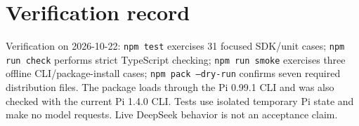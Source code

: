\documentclass[10pt]{ltjsarticle}
\begin{document}
\section{Verification record}
Verification on 2026-10-22: \texttt{npm test} exercises 31 focused SDK/unit
cases; \texttt{npm run check} performs strict TypeScript checking;
\texttt{npm run smoke} exercises three offline CLI/package-install cases;
\texttt{npm pack --dry-run} confirms seven required distribution files.
The package loads through the Pi 0.99.1 CLI and was also checked with the
current Pi 1.4.0 CLI. Tests use isolated temporary Pi state and make no model
requests. Live DeepSeek behavior is not an acceptance claim.
\end{document}
